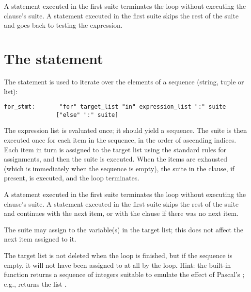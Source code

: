 A  statement executed in the first suite terminates the
loop without executing the  clause's suite.  A
 statement executed in the first suite skips the rest
of the suite and goes back to testing the expression.

\section{The  statement}

The  statement is used to iterate over the elements of a
sequence (string, tuple or list):

\begin{verbatim}
for_stmt:       "for" target_list "in" expression_list ":" suite
               ["else" ":" suite]
\end{verbatim}

The expression list is evaluated once; it should yield a sequence.  The
suite is then executed once for each item in the sequence, in the
order of ascending indices.  Each item in turn is assigned to the
target list using the standard rules for assignments, and then the
suite is executed.  When the items are exhausted (which is immediately
when the sequence is empty), the suite in the  clause, if
present, is executed, and the loop terminates.

A  statement executed in the first suite terminates the
loop without executing the  clause's suite.  A
 statement executed in the first suite skips the rest
of the suite and continues with the next item, or with the 
clause if there was no next item.

The suite may assign to the variable(s) in the target list; this does
not affect the next item assigned to it.

The target list is not deleted when the loop is finished, but if the
sequence is empty, it will not have been assigned to at all by the
loop.  Hint: the built-in function  returns a
sequence of integers suitable to emulate the effect of Pascal's
;
e.g.,  returns the list \code{[0, 1, 2]}.

